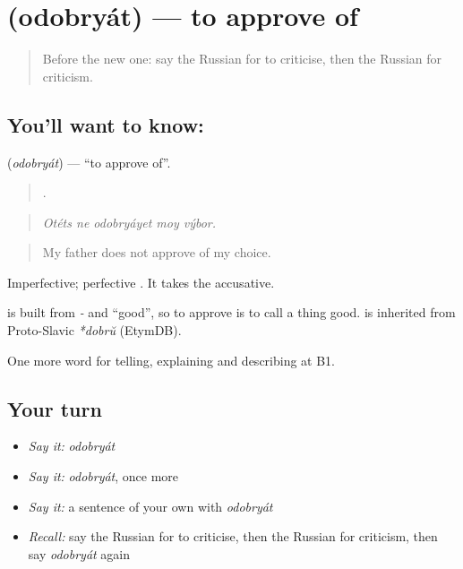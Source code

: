 \section[\texorpdfstring{\ru{одобрять} (odobryát)}{одобрять (odobryát)}]{ (odobryát) — to approve of}

\label{lesson:RU-C343-odobryat}



\begin{quote}
Before the new one: say the Russian for to criticise, then the Russian for criticism.
\end{quote}

\subsection*{You'll want to know: }
\textbf{} (\emph{odobryát}) — \textquotedblleft{}to approve of\textquotedblright{}.

\begin{quote}
    .
\end{quote}

\begin{quote}
\emph{Otéts ne odobryáyet moy výbor.}
\end{quote}

\begin{quote}
My father does not approve of my choice.
\end{quote}

Imperfective; perfective \emph{}. It takes the accusative.

\begin{cousinweb}
\textbf{} is built from \emph{-} and \emph{} \textquotedblleft{}good\textquotedblright{}, so to approve is to call a thing good. \emph{} is inherited from Proto-Slavic \emph{*dobrŭ} (EtymDB).
\end{cousinweb}

\begin{grammarlens}[title={What you've built}]
One more word for telling, explaining and describing at B1.
\end{grammarlens}

\subsection*{Your turn}
\begin{itemize}
\raggedright
  \item \emph{Say it:} \emph{odobryát}
  \item \emph{Say it:} \emph{odobryát}, once more
  \item \emph{Say it:} a sentence of your own with \emph{odobryát}
  \item \emph{Recall:} say the Russian for to criticise, then the Russian for criticism, then say \emph{odobryát} again
\end{itemize}


